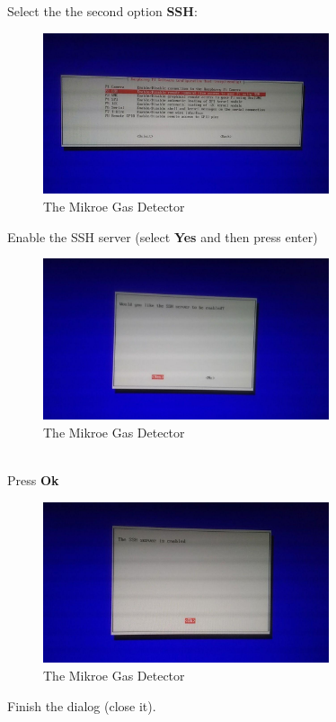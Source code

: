 \documentclass[11pt]{report}
\begin{document}
			Select the the second option \textbf{SSH}:
			\begin{figure}[ht]
				\centering
				\includegraphics[width=0.75\textwidth]{images/pi/ssh_2.jpg} 
				\caption{The Mikroe Gas Detector}
			\end{figure}
			\newpage
			Enable the SSH server (select \textbf{Yes} and then press enter)
			\begin{figure}[ht]
				\centering
				\includegraphics[width=0.75\textwidth]{images/pi/ssh_3.jpg} 
				\caption{The Mikroe Gas Detector}
			\end{figure}\\
			Press \textbf{Ok}
			\begin{figure}[ht]
				\centering
				\includegraphics[width=0.75\textwidth]{images/pi/ssh_4.jpg} 
				\caption{The Mikroe Gas Detector}
			\end{figure}
			\newpage
			Finish the dialog (close it).
\end{document}
